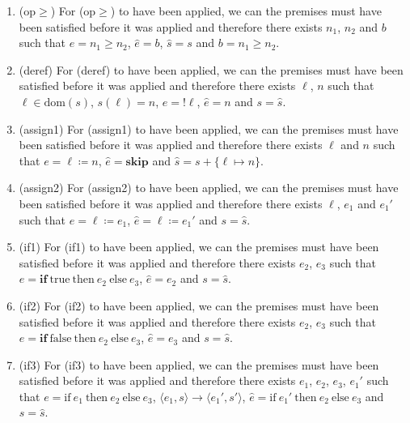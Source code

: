 \documentclass[10pt,\jkfside,a4paper]{article}
\begin{document}
\begin{enumerate}
\begin{enumerate}[label=\arabic{inversion}.]

\item (op$\geq$) For (op$\geq$) to have been applied, we can the premises must
have been satisfied before it was applied and therefore there exists $n_1$,
$n_2$ and $b$ such that $e = n_1 \geq n_2$, $\hat{e} = b$, $\hat{s} = s$ and
$b = n_1 \geq n_2$.


\item (deref) For (deref) to have been applied, we can the premises must have
been satisfied before it was applied and therefore there exists $\ell$, $n$
such that $\ell \in \text{dom}(s)$, $s(\ell) = n$, $e = !\ell$,
$\hat{e} = n$ and $s = \hat{s}$.


\item (assign1) For (assign1) to have been applied, we can the premises must
have been satisfied before it was applied and therefore there exists $\ell$
and $n$ such that $e = \ell \coloneqq n$, $\hat{e} = \textbf{skip}$ and
$\hat{s} = s + \{\ell \mapsto n\}$.


\item (assign2) For (assign2) to have been applied, we can the premises must
have been satisfied before it was applied and therefore there exists
$\ell$, $e_1$ and $e_1'$ such that $e = \ell \coloneqq e_1$, $\hat{e} = \ell
 \coloneqq e_1'$ and $s = \hat{s}$.


\item (if1) For (if1) to have been applied, we can the premises must have
been satisfied before it was applied and therefore there exists $e_2$,
 $e_3$ such that $e = \textbf{if} \ \text{true} \
\text{then} \ e_2 \ \text{else} \ e_3$, $\hat{e} = e_2$ and
$s = \hat{s}$.


\item (if2) For (if2) to have been applied, we can the premises must have
been satisfied before it was applied and therefore there exists $e_2$,
$e_3$ such that $e = \textbf{if} \ \text{false} \ \text{then} \ e_2 \
\text{else} \ e_3$, $\hat{e} = e_3$ and $s = \hat{s}$.


\item (if3) For (if3) to have been applied, we can the premises must have
been satisfied before it was applied and therefore there exists $e_1$,
$e_2$, $e_3$, $e_1'$ such that $e = \text{if} \ e_1 \ \text{then} \ e_2 \
\text{else} \ e_3$, $ \langle e_1, s \rangle \to \langle e_1', s' \rangle$,
$\hat{e} = \text{if} \ e_1' \ \text{then} \ e_2 \ \text{else} \ e_3$ and $s
= \hat{s}$.


\end{enumerate}
\end{enumerate}
\end{document}
